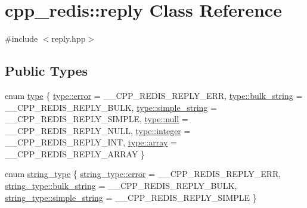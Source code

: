 \hypertarget{classcpp__redis_1_1reply}{}\section{cpp\+\_\+redis\+:\+:reply Class Reference}
\label{classcpp__redis_1_1reply}


{\ttfamily \#include $<$reply.\+hpp$>$}

\subsection*{Public Types}
\begin{DoxyCompactItemize}
\item 
enum \hyperlink{classcpp__redis_1_1reply_acc272b2a52164cac1d110c619a0b25bd}{type} \{ \newline
\hyperlink{classcpp__redis_1_1reply_acc272b2a52164cac1d110c619a0b25bdacb5e100e5a9a3e7f6d1fd97512215282}{type\+::error} = \+\_\+\+\_\+\+C\+P\+P\+\_\+\+R\+E\+D\+I\+S\+\_\+\+R\+E\+P\+L\+Y\+\_\+\+E\+RR, 
\hyperlink{classcpp__redis_1_1reply_acc272b2a52164cac1d110c619a0b25bdaffdc5e3d4a1ba77345a59a89c9f70764}{type\+::bulk\+\_\+string} = \+\_\+\+\_\+\+C\+P\+P\+\_\+\+R\+E\+D\+I\+S\+\_\+\+R\+E\+P\+L\+Y\+\_\+\+B\+U\+LK, 
\hyperlink{classcpp__redis_1_1reply_acc272b2a52164cac1d110c619a0b25bda42e59301bab38b6e2a173baf105990dd}{type\+::simple\+\_\+string} = \+\_\+\+\_\+\+C\+P\+P\+\_\+\+R\+E\+D\+I\+S\+\_\+\+R\+E\+P\+L\+Y\+\_\+\+S\+I\+M\+P\+LE, 
\hyperlink{classcpp__redis_1_1reply_acc272b2a52164cac1d110c619a0b25bda37a6259cc0c1dae299a7866489dff0bd}{type\+::null} = \+\_\+\+\_\+\+C\+P\+P\+\_\+\+R\+E\+D\+I\+S\+\_\+\+R\+E\+P\+L\+Y\+\_\+\+N\+U\+LL, 
\newline
\hyperlink{classcpp__redis_1_1reply_acc272b2a52164cac1d110c619a0b25bda157db7df530023575515d366c9b672e8}{type\+::integer} = \+\_\+\+\_\+\+C\+P\+P\+\_\+\+R\+E\+D\+I\+S\+\_\+\+R\+E\+P\+L\+Y\+\_\+\+I\+NT, 
\hyperlink{classcpp__redis_1_1reply_acc272b2a52164cac1d110c619a0b25bdaf1f713c9e000f5d3f280adbd124df4f5}{type\+::array} = \+\_\+\+\_\+\+C\+P\+P\+\_\+\+R\+E\+D\+I\+S\+\_\+\+R\+E\+P\+L\+Y\+\_\+\+A\+R\+R\+AY
 \}
\item 
enum \hyperlink{classcpp__redis_1_1reply_ac192ba4cb8f2bb6e7cb465edf755328b}{string\+\_\+type} \{ \hyperlink{classcpp__redis_1_1reply_ac192ba4cb8f2bb6e7cb465edf755328bacb5e100e5a9a3e7f6d1fd97512215282}{string\+\_\+type\+::error} = \+\_\+\+\_\+\+C\+P\+P\+\_\+\+R\+E\+D\+I\+S\+\_\+\+R\+E\+P\+L\+Y\+\_\+\+E\+RR, 
\hyperlink{classcpp__redis_1_1reply_ac192ba4cb8f2bb6e7cb465edf755328baffdc5e3d4a1ba77345a59a89c9f70764}{string\+\_\+type\+::bulk\+\_\+string} = \+\_\+\+\_\+\+C\+P\+P\+\_\+\+R\+E\+D\+I\+S\+\_\+\+R\+E\+P\+L\+Y\+\_\+\+B\+U\+LK, 
\hyperlink{classcpp__redis_1_1reply_ac192ba4cb8f2bb6e7cb465edf755328ba42e59301bab38b6e2a173baf105990dd}{string\+\_\+type\+::simple\+\_\+string} = \+\_\+\+\_\+\+C\+P\+P\+\_\+\+R\+E\+D\+I\+S\+\_\+\+R\+E\+P\+L\+Y\+\_\+\+S\+I\+M\+P\+LE
 \}
\end{DoxyCompactItemize}
